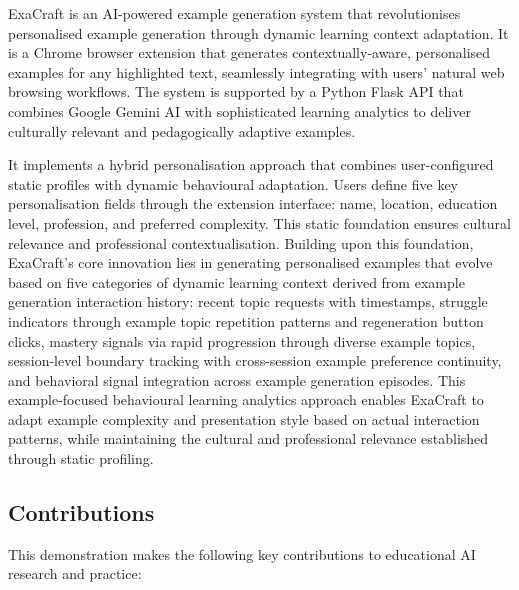 \documentclass[sigconf]{acmart}
\begin{document}
ExaCraft is an AI-powered example generation system that revolutionises personalised example generation through dynamic learning context adaptation. It is a Chrome browser extension that generates contextually-aware, personalised examples for any highlighted text, seamlessly integrating with users' natural web browsing workflows. The system is supported by a Python Flask API that combines Google Gemini AI with sophisticated learning analytics to deliver culturally relevant and pedagogically adaptive examples.

It implements a hybrid personalisation approach that combines user-configured static profiles with dynamic behavioural adaptation. Users define five key personalisation fields through the extension interface: name, location, education level, profession, and preferred complexity. This static foundation ensures cultural relevance and professional contextualisation. Building upon this foundation, ExaCraft's core innovation lies in generating personalised examples that evolve based on five categories of dynamic learning context derived from example generation interaction history: recent topic requests with timestamps, struggle indicators through example topic repetition patterns and regeneration button clicks, mastery signals via rapid progression through diverse example topics, session-level boundary tracking with cross-session example preference continuity, and behavioral signal integration across example generation episodes. This example-focused behavioural learning analytics approach enables ExaCraft to adapt example complexity and presentation style based on actual interaction patterns, while maintaining the cultural and professional relevance established through static profiling.

\subsection{Contributions}

This demonstration makes the following key contributions to educational AI research and practice:
\end{document}
